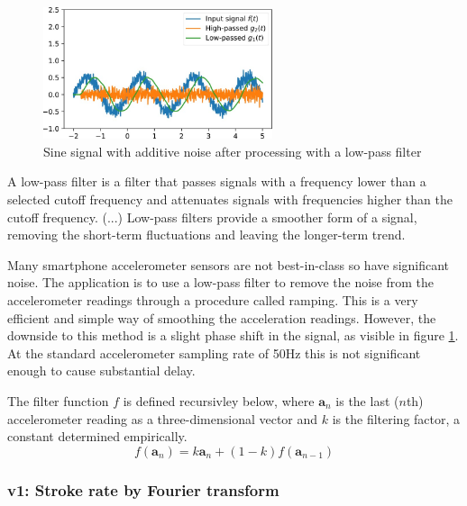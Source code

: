 \documentclass[11pt,twoside,a4paper]{report}
\begin{document}
\begin{figure}[h!]
  \centering
  \includegraphics[width=0.6\textwidth]{lowpass-sine-ch2f15.jpg}
  \caption{Sine signal with additive noise after processing with a low-pass filter \cite{fischer_figure_2018}}
  \label{fig:lowpass}
\end{figure}

\begin{displayquote}
  A low-pass filter is a filter that passes signals with a frequency lower than a selected cutoff frequency and attenuates signals with frequencies higher than the cutoff frequency. (...) Low-pass filters provide a smoother form of a signal, removing the short-term fluctuations and leaving the longer-term trend. \cite{low-pass_2021}
\end{displayquote}

Many smartphone accelerometer sensors are not best-in-class so have significant noise. The application is to use a low-pass filter to remove the noise from the accelerometer readings through a procedure called ramping. This is a very efficient and simple way of smoothing the acceleration readings. However, the downside to this method is a slight phase shift in the signal, as visible in figure \ref{fig:lowpass}. At the standard accelerometer sampling rate of 50Hz this is not significant enough to cause substantial delay.

\label{filteringFactor}
The filter function $f$ is defined recursivley below, where $\textbf{a}_n$ is the last ($n$th) accelerometer reading as a three-dimensional vector and $k$ is the filtering factor, a constant determined empirically.
\begin{equation}\label{filterEqn}
  f \left( \textbf{a}_n \right) = k \textbf{a}_n + \left( 1 - k \right) f \left( \textbf{a}_{n-1} \right)
\end{equation}

\subsubsection{v1: Stroke rate by Fourier transform}
\end{document}
